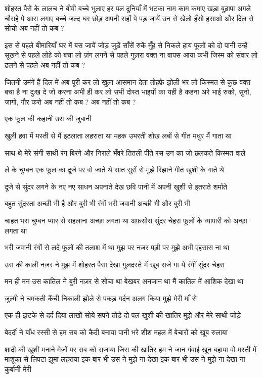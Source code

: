 शोहरत पैसे के लालच ने बीवी बच्चे भुलाए
हर पल दुनियाँ में भटका नाम काम कमाए
खड़ा बुढ़ापा अगले चौराहे पे आस लगाए
बच्चे जल्द घर छोड़ अपनी राहों पे पड़ जायें
उन से खेलो हँसो हसाओ और दिल से सोचो
अब नहीं तो कब ?





इस से पहले बीमारियाँ घर में बस जायें
जोड़ जुड़ें साँसें रुकें मुँह से निकले हाय
फूलों को दो पानी उन्हें सूखने से पहले
लोहे को बचा लो ज़ंग लगने से पहले
गुज़रा वक्त ना वापस आया कभी
जिस्म को संवार लो ढलने से पहले
अब नहीं तो कब ?

जितनी उमंगें हैं दिल में अब पूरी कर लो
खुला आसमान देता तोहफ़े झोली भर लो
किस्मत से कुछ वक्त बचा है
ना दुःख दे जो करना अभी ही कर लो
सभी दोस्त भाइयों का यही है कहना
अरे भाई रुको, सुनो, जागो, गौर करो
अब नहीं तो कब ?
अब नहीं तो कब ?

एक फूल की कहानी
उस की ज़ुबानी

खुली हवा में मस्ती से मैं 
इठलाता लहराता था
महक उभरती शोख लबों से 
गीत मधुर मैं गाता था



साथ थे मेरे संगी साथी 
रंग बिरंगे और निराले
भँवरे तितली पीते रस उन का 
जो छलकते किस्मत वाले

ले के चुम्बन एक फूल का
 दूजे पर वो जाते थे
सात सुरों से मुझे रिझाने 
गीत खुशी के गाते थे


दूजे से सुंदर लगने के 
नए नए साधन अपनाते
देख छवि पानी में अपनी 
खुशी से इतराते शर्माते

बहुत सुंदरता अच्छी भी है और बुरी भी
रंगों भरी जवानी अच्छी भी और बुरी भी




चाहत भरा चुम्बन प्यार से 
सहलाना अच्छा लगता था
अफ़सोस सुंदर चेहरा फूलों के 
व्यापारी को अच्छा लगता था

भरी जवानी रंगों से लदे 
फूलों की तलाश में था
मुझ पर नज़र पड़ी पर 
मुझे अभी एहसास ना था


उस की काली नज़र ने 
मुझ में शोहरत पैसा देखा
गुलदस्ते में खूब सजे गा 
ये रंगीं सुंदर चेहरा

मन ही मन उस कातिल ने 
बुरी नज़र से सोचा था
बेखबर अनजान था मैं 
कातिल में आशिक देखा था

ज़ुल्मी ने चमकती कैंची निकाली झोले से
पकड़ गर्दन अलग किया मुझे मेरी माँ से

एक ही झटके से दर्द दिया 
लाखों सोये सपने तोड़े
दो पल खुशी की खातिर 
मुझे और मेरे साथी जोड़े

बेदर्दी ने बाँध रस्सी से 
हम सब को कैदी बनाया
पानी भरे शीश महल में 
बेचारों को खूब रुलाया

शादी की खुशी मनाने 
मेज़ों पर सब को सजाया
जिस की खातिर हम ने जान गंवाई 
खून बहाया
वो मस्ती में माशूका से लिपटा झूमा लहराया
इक बार भी उस ने मुझे ना देखा
इक बार भी उस ने मुझे ना देखा 
ना कुर्बानी मेरी


